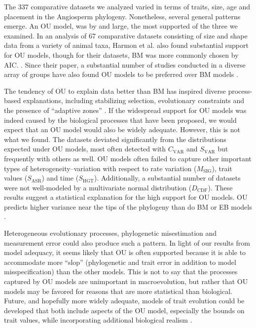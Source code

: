 The 337 comparative datasets we analyzed varied in terms of traits, size, age and placement in the Angiosperm phylogeny. Nonetheless, several general patterns emerge. An OU model, was by and large, the most supported of the three we examined. In an analysis of 67 comparative datasets consisting of size and shape data from a variety of animal taxa, Harmon et al. \citep{Harmon2010} also found substantial support for OU models, though for their datasets, BM was more commonly chosen by AIC. \citep[We note, however, that many of their datasets were quite small; see][]{SlaterPennell}. Since their paper, a substantial number of studies conducted in a diverse array of groups have also found OU models to be preferred over BM models \citep[e.g.,][]{Burbrink2012, Wiens2013, Lopez2013, Thomaspreprint}. 

The tendency of OU to explain data better than BM has inspired diverse process-based explanations, including stabilizing selection, evolutionary constraints and the presence of ``adaptive zones'' \citep{HansenMartins1996, ButlerKing2004, Hansen2012book, PennellHarmon}. 
If the widespread support for OU models was indeed caused by the biological processes that have been proposed, we would expect that an OU model would also be widely adequate. However, this is not what we found. The datasets deviated significantly from the distributions expected under OU models, most often detected with $C_{\text{VAR}}$ and $S_{\text{VAR}}$ but frequently with others as well. OU models often failed to capture other important types of heterogeneity--variation with respect to rate variation ($M_{\text{SIG}}$), trait values ($S_{\text{ASR}}$) and time ($S_{\text{HGT}}$). Additionally, a substantial number of datasets were not well-modeled by a multivariate normal distribution ($D_{\text{CDF}}$). These results suggest a statistical explanation for the high support for OU models. OU predicts higher variance near the tips of the phylogeny than do BM or EB models \citep[see Figure 1 in][]{Harmon2010}. 

Heterogeneous evolutionary processes, phylogenetic misestimation and measurement error could also produce such a pattern. In light of our results from model adequacy, it seems likely that OU is often supported because it is able to accommodate more ``slop'' (phylogenetic and trait error in addition to model misspecification) than the other models.  This is not to say that the processes captured by OU models are unimportant in macroevolution, but rather that OU models may be favored for reasons that are more statistical than biological. Future, and hopefully more widely adequate, models of trait evolution could be developed that both include aspects of the OU model, especially the bounds on trait values, while incorporating additional biological realism \citep[for a recent example of such a model, see][]{NuismerHarmon}.

